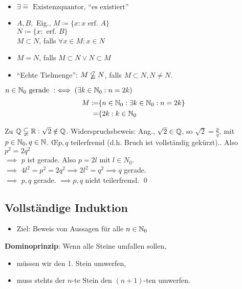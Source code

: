\documentclass[consecutivenumbering]{gadsescript}
\begin{document}
\begin{itemize}
	\item $\exists \hat= \text{ Existenzquantor, ``es existiert''}$
	\item $ A, B, $ Eig., $M\coloneqq \{ x : x \text{ erf. } A \}$\\
		$N \coloneqq \{ x : \text{ erf. } B \} $\\
	$ M \subset N$, falls $ \forall x \in M : x \in N $
	\item $ M = N $, falls $ M \subset N \vee N \subset M $
	\item ``Echte Tielmenge'': $ M \nsubseteqq N$, falls $ M \subset N, N \neq N.$
\end{itemize}

\begin{subexample}
	$ n \in \mathbb{N}_0 \text{ gerade } :\iff ( \exists k \in \mathbb{N}_0 : n = 2k) $\\
	\begin{align}
		M \coloneqq &\{ n \in \mathbb{N}_0 : \exists k \in \mathbb{N}_0 : n = 2k \}\\
		=&\{2k : k \in \mathbb{N}_0
	\end{align}
\end{subexample}

\begin{example}[$ \N \subsetneqq \N_0 \subsetneqq \Z \subsetneqq \Q \subsetneqq \R $]
	Zu $ \mathbb{Q} \subsetneqq \mathbb{R} : \sqrt{2} \notin \mathbb{Q} $. Widerspruchsbeweis: Ang.,
	$ \sqrt{2} \in \mathbb{Q} $, so $ \sqrt{2} = \frac{p}{q} $, mit $ p \in \mathbb{N}_0, q \in \mathbb{N} $. \OE $ p, q $ teilerfremd (d.h. Bruch ist vollständig gekürzt).. Also $ p^2 = 2q^2 $\\
	$\implies$ $ p $ ist gerade. Also $ p = 2l $ mit $l \in N_0$.\\
	$\implies$ $ 4l^2 = p^2 = 2q^2 \implies 2l^2 = q^2 \implies q $ gerade.\\
	$ \implies $ $ p, q $ gerade. $ \implies p, q $ nicht teilerfremd. \qed
\end{example}

\subsection{Vollständige Induktion}
\begin{itemize}
	\item Ziel: Beweis von Aussagen für alle $ n \in \mathbb{N}_0 $
\end{itemize}
\textbf{Dominoprinzip}: Wenn alle Steine umfallen sollen,
\begin{itemize}
	\item müssen wir den 1. Stein umwerfen,
	\item muss stehts der $n$-te Stein den $(n+1)$-ten umwerfen.
\end{itemize}
\end{document}
